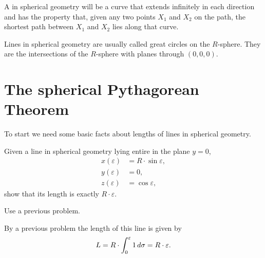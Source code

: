 \documentclass{ximera}
\begin{document}
\begin{definition}
A  in spherical geometry will be a curve that extends
infinitely in each direction and has the property that, given any two
points $X_{1}$ and $X_{2}$ on the path, the shortest path between
$X_{1}$ and $X_{2}$ lies along that curve.

Lines in spherical geometry are usually called great circles on the
$R$-sphere. They are the intersections of the $R$-sphere with planes
through $(0,0,0)$.
\end{definition}


\section{The spherical Pythagorean Theorem}

To start we need some basic facts about lengths of lines in spherical
geometry.

\begin{problem}
  Given a line in spherical geometry lying entire in the plane $y=0$,
  \begin{align*}
    x(\varepsilon) &= R\cdot\sin\varepsilon,\\
    y(\varepsilon) &= 0,\\
    z(\varepsilon) &= \cos\varepsilon,
  \end{align*}
  show that its length is exactly $R\cdot \varepsilon$.
  \begin{hint}
    Use a previous problem.
  \end{hint}
  \begin{freeResponse}
    By a previous problem the length of this line is given by
    \[
    L=R \cdot \int_{0}^{\varepsilon} 1 \,d\sigma = R\cdot\varepsilon.
    \]
  \end{freeResponse}
\end{problem}
\end{document}
